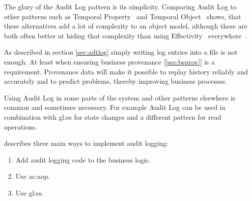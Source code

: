 The glory of the Audit Log pattern is its simplicity. Comparing Audit Log to other patterns such as Temporal Property~\citep{TemporalProperty} and Temporal Object~\citep{TemporalObject} shows, that these alternatives add a lot of complexity to an object model, although these are both often better at hiding that complexity than using Effectivity~\citep{Effectiv17} everywhere~\citep{AuditLog}.

As described in section \ref{sec:adtlog} simply writing log entries into a file is not enough. At least when ensuring business provenance [\ref{sec:bsprov}] is a requirement. Provenance data will make it possible to replay history reliably and accurately and to predict problems, thereby improving business processes.



Using Audit Log in some parts of the system and other patterns elsewhere is common and sometimes necessary. For example Audit Log can be used in combination with \gls{gl:es} for state changes and a different pattern for read operations.


\citep{richardson2018microservices} describes three main ways to implement audit logging:

\begin{enumerate}
  \item Add audit logging code to the business logic.
  \item Use \gls{ac:aop}.
  \item Use \gls{gl:es}.
\end{enumerate}

